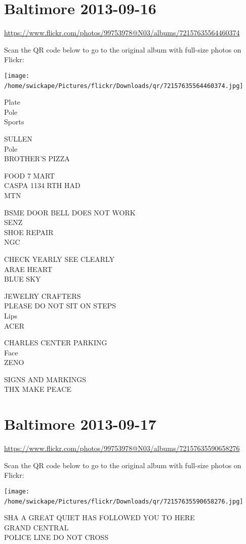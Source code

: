 \documentclass[10pt,letterpaper]{article}
\begin{document}
\section*{Baltimore 2013-09-16}

\url{https://www.flickr.com/photos/99753978@N03/albums/72157635564460374}

Scan the QR code below to go to the original album with full-size photos on Flickr:

\texttt{[image: /home/swickape/Pictures/flickr/Downloads/qr/72157635564460374.jpg]}
\

Plate\\
Pole\\
Sports

SULLEN\\
Pole\\
BROTHER'S PIZZA

FOOD 7 MART\\
CASPA 1134 RTH HAD\\
MTN

BSME DOOR BELL DOES NOT WORK\\
SENZ\\
SHOE REPAIR\\
NGC

CHECK YEARLY SEE CLEARLY\\
ARAE HEART\\
BLUE SKY

JEWELRY CRAFTERS\\
PLEASE DO NOT SIT ON STEPS\\
Lips\\
ACER

CHARLES CENTER PARKING\\
Face\\
ZENO

SIGNS AND MARKINGS\\
THX MAKE PEACE
\

\section*{Baltimore 2013-09-17}

\url{https://www.flickr.com/photos/99753978@N03/albums/72157635590658276}

Scan the QR code below to go to the original album with full-size photos on Flickr:

\texttt{[image: /home/swickape/Pictures/flickr/Downloads/qr/72157635590658276.jpg]}
\

SHA A GREAT QUIET HAS FOLLOWED YOU TO HERE\\
GRAND CENTRAL\\
POLICE LINE DO NOT CROSS
\end{document}
